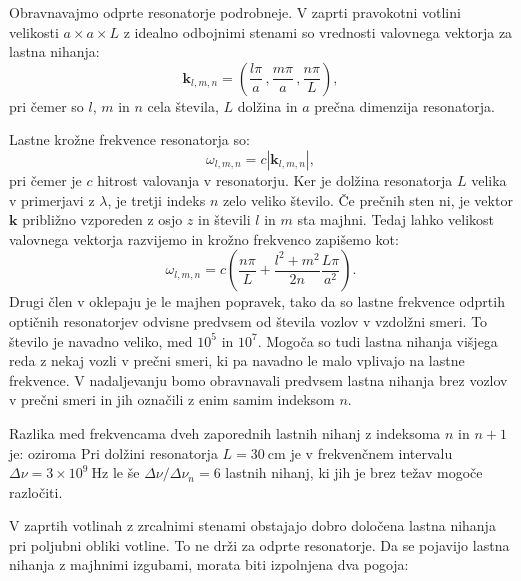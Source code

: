Obravnavajmo odprte resonatorje podrobneje. V zaprti pravokotni votlini velikosti
$a\times a\times L$ z idealno odbojnimi stenami so vrednosti
valovnega vektorja za lastna nihanja:
\begin{equation}
\mathbf{k}_{l,m,n}=\left(\frac{l\pi}{a}\,,\frac{m\pi}{a}\,,\frac{n\pi}{L}\right)\!\!,\label{eq:k-votlina}
\end{equation}
pri čemer so $l$, $m$ in $n$ cela števila, $L$ dolžina in $a$ prečna
dimenzija resonatorja. 

Lastne krožne frekvence resonatorja so:
\begin{equation}
\omega_{l,m,n}=c|\mathbf{k}_{l,m,n}|,\label{eq:omega-votlina}
\end{equation}
pri čemer je $c$ hitrost valovanja v resonatorju.
Ker je dolžina resonatorja $L$ velika v primerjavi z $\lambda$, je tretji indeks $n$
zelo veliko število. Če prečnih sten ni, je vektor $\mathbf{k}$ približno
vzporeden z osjo $z$ in števili $l$ in $m$ sta majhni. Tedaj
lahko velikost valovnega vektorja razvijemo in krožno frekvenco zapišemo kot:
\begin{equation}
\omega_{l,m,n}=c\left(\frac{n\pi}{L}+\frac{l^{2}+m^{2}}{2n}\frac{L \pi}{a^{2}}\right)\!\!.
\label{eq:delta-omega-resonator-razvoj}
\end{equation}
Drugi člen v oklepaju je le majhen popravek, tako da so
lastne frekvence odprtih optičnih resonatorjev odvisne predvsem od
števila vozlov v vzdolžni smeri. To število je navadno veliko, med $10^{5}$
in $10^{7}$. Mogoča so tudi lastna nihanja višjega reda z nekaj vozli v prečni
smeri, ki pa navadno le malo vplivajo na lastne frekvence. V nadaljevanju
bomo obravnavali predvsem lastna nihanja brez vozlov v prečni smeri in
jih označili z enim samim indeksom $n$.

Razlika med frekvencama dveh zaporednih lastnih nihanj z
indeksoma 
$n$ in $n+1$ je:
oziroma
Pri dolžini resonatorja $L=30~\si{\centi\metre}$ je v frekvenčnem
intervalu $\Delta \nu = 3\times10^{9}~\si{\hertz}$ le še $\Delta \nu /\Delta \nu_n = 6$ lastnih 
nihanj, ki jih je brez težav mogoče razločiti.

V zaprtih votlinah z zrcalnimi stenami obstajajo dobro določena lastna
nihanja pri poljubni obliki votline. To ne drži za odprte resonatorje.
Da se pojavijo lastna nihanja z majhnimi izgubami, morata
biti izpolnjena dva pogoja:

